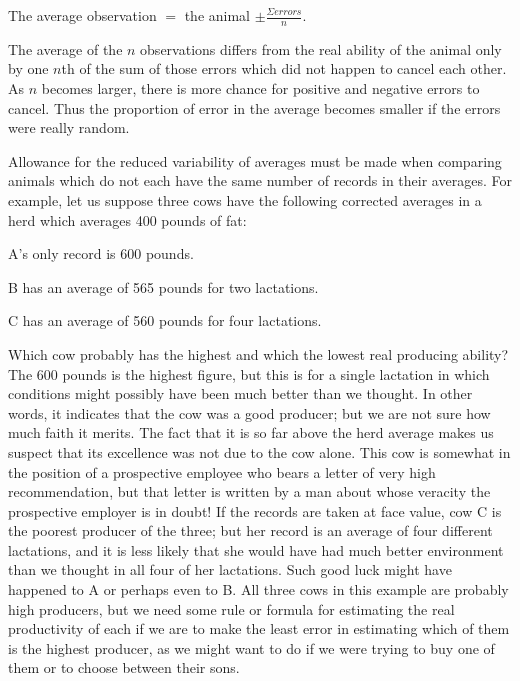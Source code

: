 The average observation $=$ the animal $\pm \frac{\Sigma errors}{n}$.

The average of the $n$ observations differs from the real ability of the
animal only by one $n$th of the sum of those errors which did not happen
to cancel each other. As $n$ becomes larger, there is more chance for
positive and negative errors to cancel. Thus the proportion of error in
the average becomes smaller if the errors were really random.

Allowance for the reduced variability of averages must be made
when comparing animals which do not each have the same number of
records in their averages. For example, let us suppose three cows have
the following corrected averages in a herd which averages 400 pounds
of fat:

A's only record is 600 pounds.

B has an average of 565 pounds for two lactations.

C has an average of 560 pounds for four lactations.

\noindent
Which cow probably has the highest and which the lowest real producing
ability? The 600 pounds is the highest figure, but this is for a
single lactation in which conditions might possibly have been much better
than we thought. In other words, it indicates that the cow was a
good producer; but we are not sure how much faith it merits. The fact
that it is so far above the herd average makes us suspect that its excellence
was not due to the cow alone. This cow is somewhat in the
position of a prospective employee who bears a letter of very high
recommendation, but that letter is written by a man about whose veracity
the prospective employer is in doubt! If the records are taken at
face value, cow C is the poorest producer of the three; but her record is
an average of four different lactations, and it is less likely that she would
have had much better environment than we thought in all four of her
lactations. Such good luck might have happened to A or perhaps even
to B. All three cows in this example are probably high producers, but
we need some rule or formula for estimating the real productivity of
each if we are to make the least error in estimating which of them is the
highest producer, as we might want to do if we were trying to buy one
of them or to choose between their sons.

